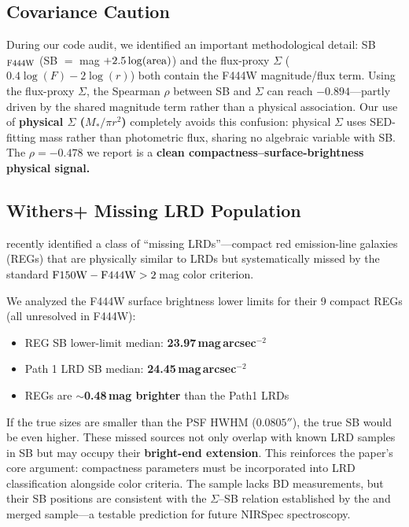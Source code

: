 \documentclass[twocolumn,linenumbers]{aastex631}
\begin{document}
\subsection{Covariance Caution}

During our code audit, we identified an important methodological detail: SB$_{\rm F444W}$ (SB $=$ mag $+ 2.5\log({\rm area})$) and the flux-proxy $\Sigma$ ($0.4\log(F) - 2\log(r)$) both contain the F444W magnitude/flux term. Using the flux-proxy $\Sigma$, the Spearman $\rho$ between SB and $\Sigma$ can reach $-0.894$---partly driven by the shared magnitude term rather than a physical association. Our use of \textbf{physical $\Sigma$ ($M_*/\pi r^2$)} completely avoids this confusion: physical $\Sigma$ uses SED-fitting mass rather than photometric flux, sharing no algebraic variable with SB. The $\rho = -0.478$ we report is a \textbf{clean compactness--surface-brightness physical signal.}

\subsection{Withers+ Missing LRD Population}

\citet{Withers2026} recently identified a class of ``missing LRDs''---compact red emission-line galaxies (REGs) that are physically similar to LRDs but systematically missed by the standard ${\rm F150W}-{\rm F444W} > 2$\,mag color criterion.

We analyzed the F444W surface brightness lower limits for their 9 compact REGs (all unresolved in F444W):
\begin{itemize}
\item \citet{Withers2026} REG SB lower-limit median: \textbf{23.97\,mag\,arcsec$^{-2}$}
\item Path 1 LRD SB median: \textbf{24.45\,mag\,arcsec$^{-2}$}
\item \citet{Withers2026} REGs are $\sim$\textbf{0.48\,mag brighter} than the Path1 LRDs
\end{itemize}

If the true sizes are smaller than the PSF HWHM ($0.0805''$), the true SB would be even higher. These missed sources not only overlap with known LRD samples in SB but may occupy their \textbf{bright-end extension}. This reinforces the paper's core argument: compactness parameters must be incorporated into LRD classification alongside color criteria. The \citet{Withers2026} sample lacks BD measurements, but their SB positions are consistent with the $\Sigma$--SB relation established by the \citet{Kokorev2024} and \citet{deGraaff2025} merged sample---a testable prediction for future NIRSpec spectroscopy.
\end{document}
